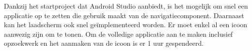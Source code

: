 Dankzij het startproject dat Android Studio aanbiedt, is het mogelijk om snel een applicatie op te zetten 
die gebruik maakt van de navigatiecomponent. Daarnaast kan het laadscherm ook snel geïmplementeerd worden. 
Er moet enkel al een icoon aanwezig zijn om te tonen. Om de volledige applicatie aan te maken inclusief opzoekwerk
en het aanmaken van de icoon is er 1 uur gespendeerd.

